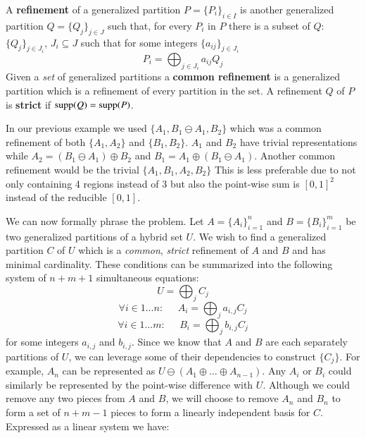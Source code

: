 \begin{definition}
	A \textbf{refinement} of a generalized partition $P = \{P_i\}_{i \in I}$ is another generalized partition
	$Q = \{Q_j \}_{j \in J}$ such that, for every $P_i$ in $P$ there is a subset of $Q$: $\{ Q_{j} \}_{j \in J_i}$, 
	$J_i \subseteq J$ such that for some integers $\{a_{ij}\}_{j \in J_i}$
	\begin{equation}
		P_i = \bigoplus_{j \in J_i} a_{ij} Q_{j}
	\end{equation}
	Given a \emph{set} of generalized partitions a \textbf{common refinement} is a generalized partition which is a 
	refinement of every partition in the set. 
	A refinement $Q$ of $P$ is \textbf{strict} if $\text{supp}(Q) = \text{supp}(P)$.
\end{definition}


In our previous example we used $\{ A_1, B_1 \ominus A_1, B_2 \}$ which was a common refinement of both
$\{ A_1, A_2 \}$ and $\{ B_1, B_2 \}$.
$A_1$ and $B_2$ have trivial representations while $A_2 = (B_1 \ominus A_1) \oplus B_2$ and 
$B_1 = A_1 \oplus (B_1 \ominus A_1)$.
Another common refinement would be the trivial $\{ A_1, B_1, A_2, B_2 \}$
This is less preferable due to not only containing 4 regions instead of 3 but also the point-wise sum is $[0,1]^2$
instead of the reducible $[0,1]$.


We can now formally phrase the problem.
Let $A=\{ A_i \}_{i=1}^n$ and $B=\{ B_i \}_{i =1}^m$ be two generalized partitions of a hybrid set $U$.
We wish to find a generalized partition $C$  of $U$ which is a \emph{common}, \emph{strict} refinement of $A$ and $B$
and has minimal cardinality.
These conditions can be summarized into the following system of $n+m+1$ simultaneous equations:
\begin{equation*}
	U = \bigoplus_j C_j
\end{equation*}
\begin{equation*}
	\forall i \in 1 \ldots n : \;\;\;\;\; A_i = \bigoplus_{j}  a_{i,j} C_j
\end{equation*}
\begin{equation*}
	\forall i \in 1 \ldots m : \;\;\;\;\; B_i = \bigoplus_{j} b_{i,j} C_j
\end{equation*}
for some integers $a_{i,j}$ and $b_{i,j}$.
Since we know that $A$ and $B$ are each separately partitions of $U$, 
we can leverage some of their dependencies to construct $\{C_j\}$.
For example, $A_n$ can be represented as $U \ominus ( A_1 \oplus \ldots \oplus A_{n-1} )$.
Any $A_i$ or $B_i$ could similarly be represented by the point-wise difference with $U$.
Although we could remove any two pieces from $A$ and $B$, we will choose to remove $A_n$ and $B_n$ to form a set of
$n+m-1$ pieces to form a linearly independent basis for $C$.
Expressed as a linear system we have:


